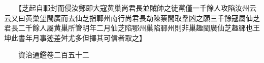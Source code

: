 　　【芝起自鄆封而侵汝鄭即大寇黄巢尚君長並賊帥之徒黨僅一千餘人攻陷汝州云云又曰黄巢望閩廣而去仙芝指鄆州南行尚君長劫陳蔡間取羣凶之願三千餘寇屬仙芝君長二千餘人屬黄巢所管明年二月仙芝陷鄂州巢陷鄆州則非巢趣閩廣仙芝趣鄆也王坤此書年月事迹差舛尤多但擇其可信者取之】

　　資治通鑑卷二百五十二  
    


 


 



 

 
  







 


　　
　　
　
　
　


　　

　















	
	









































 
  



















 





 












  
  
  

 





